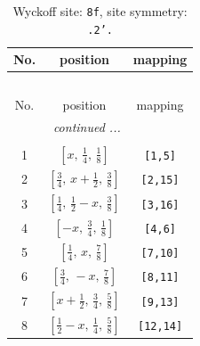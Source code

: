 \documentclass[fleqn,8pt]{jsarticle}
\begin{document}
\begin{longtable}{ccc}
\caption{Wyckoff site: {\tt 8f}, site symmetry: {\tt .2'.}}
 \\
 \hline \hline
No. & position & mapping \\ \hline \endfirsthead

\multicolumn{2}{l}{\tablename\ \thetable{}} \\
 \hline \hline
No. & position & mapping \\ \hline \endhead

 \hline \hline
\multicolumn{2}{r}{\footnotesize\it continued ...} \\ \endfoot

 \hline \hline
\multicolumn{2}{r}{} \\ \endlastfoot

1 & $\left[ x,\, \frac{1}{4},\, \frac{1}{8} \right]$ & {\tt [1,5]} \\ \hline
2 & $\left[ \frac{3}{4},\, x + \frac{1}{2},\, \frac{3}{8} \right]$ & {\tt [2,15]} \\ \hline
3 & $\left[ \frac{1}{4},\, \frac{1}{2} - x,\, \frac{3}{8} \right]$ & {\tt [3,16]} \\ \hline
4 & $\left[ - x,\, \frac{3}{4},\, \frac{1}{8} \right]$ & {\tt [4,6]} \\ \hline
5 & $\left[ \frac{1}{4},\, x,\, \frac{7}{8} \right]$ & {\tt [7,10]} \\ \hline
6 & $\left[ \frac{3}{4},\, - x,\, \frac{7}{8} \right]$ & {\tt [8,11]} \\ \hline
7 & $\left[ x + \frac{1}{2},\, \frac{3}{4},\, \frac{5}{8} \right]$ & {\tt [9,13]} \\ \hline
8 & $\left[ \frac{1}{2} - x,\, \frac{1}{4},\, \frac{5}{8} \right]$ & {\tt [12,14]} \\
\end{longtable}
\renewcommand{\arraystretch}{1.2}
\end{document}
